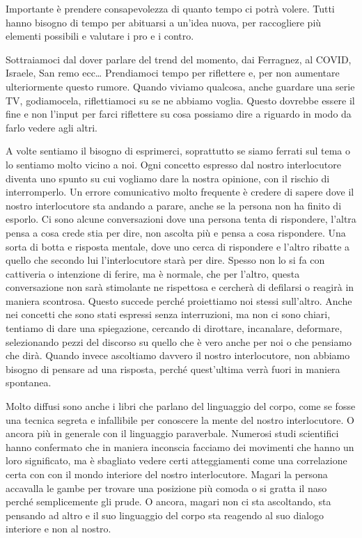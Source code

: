 \documentclass[12pt]{book} %
\begin{document}
Importante è prendere consapevolezza di quanto tempo ci potrà volere. Tutti hanno bisogno di tempo per abituarsi a
un'idea nuova, per raccogliere più elementi possibili e valutare i pro e i
contro.

Sottraiamoci dal dover parlare del trend del momento, dai Ferragnez, al COVID, Israele, San remo ecc… Prendiamoci tempo per riflettere e, per non aumentare ulteriormente questo rumore. Quando viviamo qualcosa, anche guardare una serie TV, godiamocela, riflettiamoci su se ne abbiamo voglia. Questo dovrebbe essere il fine e non l'input per farci riflettere su cosa possiamo dire a riguardo in modo da farlo vedere agli altri.

A volte sentiamo il bisogno di esprimerci, soprattutto se siamo ferrati sul tema o lo sentiamo molto vicino a noi. Ogni
concetto espresso dal nostro interlocutore diventa uno spunto su cui vogliamo dare la nostra opinione, con il rischio
di interromperlo. Un errore comunicativo molto frequente è credere di sapere dove il nostro interlocutore sta andando a
parare, anche se la persona non ha finito di esporlo. Ci sono alcune conversazioni dove una persona tenta di
rispondere, l'altra pensa a cosa crede stia per dire, non ascolta più e pensa a cosa rispondere.
Una sorta di botta e risposta mentale, dove uno cerca di rispondere e l'altro ribatte a quello che
secondo lui l'interlocutore starà per dire. Spesso non lo si fa con cattiveria o intenzione di
ferire, ma è normale, che per l'altro, questa conversazione non sarà stimolante ne rispettosa e
cercherà di defilarsi o reagirà in maniera scontrosa. Questo succede perché proiettiamo noi stessi
sull'altro. Anche nei concetti che sono stati espressi senza interruzioni, ma non ci sono chiari,
tentiamo di dare una spiegazione, cercando di dirottare, incanalare, deformare, selezionando pezzi del discorso su
quello che è vero anche per noi o che pensiamo che dirà. Quando invece ascoltiamo davvero il nostro interlocutore, non
abbiamo bisogno di pensare ad una risposta, perché quest'ultima verrà fuori in maniera spontanea.


\bigskip

Molto diffusi sono anche i libri che parlano del linguaggio del corpo, come se fosse una tecnica segreta e infallibile
per conoscere la mente del nostro interlocutore. O ancora più in generale con il linguaggio paraverbale. Numerosi studi
scientifici hanno confermato che in maniera inconscia facciamo dei movimenti che hanno un loro significato, ma è
sbagliato vedere certi atteggiamenti come una correlazione certa con con il mondo interiore del nostro interlocutore.
Magari la persona accavalla le gambe per trovare una posizione più comoda o si gratta il naso perché semplicemente gli
prude. O ancora, magari non ci sta ascoltando, sta pensando ad altro e il suo linguaggio del corpo sta reagendo al suo
dialogo interiore e non al nostro.
\end{document}
